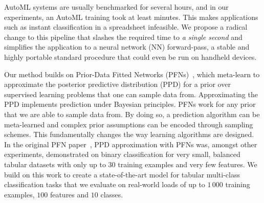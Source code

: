 \documentclass{article}
\begin{document}
AutoML systems are usually benchmarked for several hours, and in our experiments, an AutoML training took at least minutes. This makes applications such as instant classification in a spreadsheet infeasible.
%
We propose a radical change to this pipeline that slashes the required time to \textit{a single second} and simplifies the application to a neural network (NN) forward-pass, a stable and highly portable standard procedure that could even be run on handheld devices.

Our method builds on Prior-Data Fitted Networks (PFNs)~\citep{muller-iclr2022}, which meta-learn to approximate the posterior predictive distribution (PPD) for a prior over supervised learning problems that one can sample data from. 
Approximating the PPD implements prediction under Bayesian principles.
PFNs work for any prior that we are able to sample data from.
By doing so, a prediction algorithm can be meta-learned and complex prior assumptions can be encoded through sampling schemes.
This fundamentally changes the way learning algorithms are designed.
In the original PFN paper~\citep{muller-iclr2022}, PPD approximation with PFNs was, amongst other experiments, demonstrated on binary classification for very small, balanced tabular datasets with only up to $30$ training examples and very few features.
We build on this work %
to create a state-of-the-art model for tabular multi-class classification tasks that we evaluate on real-world loads of up to $1\,000$ training examples, $100$ features and $10$ classes.

\end{document}

